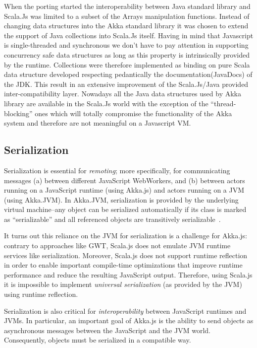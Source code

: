 \documentclass{sig-alternate}
\begin{document}
When the porting started the interoperability between Java standard library and Scala.Js was limited to a subset of the Arrays manipulation functions.
Instead of changing data structures into the Akka standard library it was chosen to extend the support of Java collections into Scala.Js itself.
Having in mind that Javascript is single-threaded and synchronous we don't have to pay attention in supporting concurrency safe data structures as long as this property is intrinsically provided by the runtime.
Collections were therefore implemented as binding on pure Scala data structure developed respecting pedantically the documentation(JavaDocs) of the JDK.
This result in an extensive improvement of the Scala.Js/Java provided inter-compatibility layer.
Nowadays all the Java data structures used by Akka library are available in the Scala.Js world with the exception of the ``thread-blocking'' ones which will totally compromise the functionality of the Akka system and therefore are not meaningful on a Javascript VM.


\subsection{Serialization}\label{sec:serialization}

Serialization is essential for {\em remoting}; more specifically, for
communicating messages (a) between different
JavaScript WebWorkers, and (b) between actors running on a JavaScript
runtime (using Akka.js) and actors running on a JVM (using Akka.JVM).
In Akka.JVM, serialization is provided by the underlying virtual
machine--any object can be serialized automatically if its class is
marked as ``serializable'' and all referenced objects are
transitively serializable~\cite{Philippsen2000,Maassen1999}.

It turns out this reliance on the JVM for serialization is a challenge for
Akka.js: contrary to approaches like GWT, Scala.js does not emulate JVM
runtime services like serialization. Moreover, Scala.js does not support
runtime reflection in order to enable important compile-time optimizations
that improve runtime performance and reduce the resulting JavaScript output. Therefore,
using Scala.js it is impossible to implement {\em universal serialization} (as
provided by the JVM) using runtime reflection.

Serialization is also critical for {\em interoperability} between JavaScript
runtimes and JVMs. In particular, an important goal of Akka.js is the
ability to send objects as asynchronous messages between the JavaScript
and the JVM world. Consequently, objects must be serialized in a compatible
way.
\end{document}
